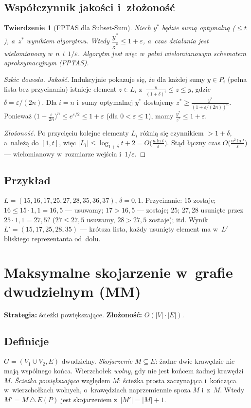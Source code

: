 \documentclass[11pt,a4paper]{article}
\theoremstyle{plain}
\newtheorem{twierdzenie}{Twierdzenie}[section]
\theoremstyle{definition}
\newcommand{\eps}{\varepsilon}
\begin{document}
\subsection*{Współczynnik jakości i~złożoność}
\begin{twierdzenie}[FPTAS dla Subset-Sum]\label{tw:approxss}
Niech $y^\ast$ będzie sumą optymalną ($\le t$), a~$z^\ast$ wynikiem algorytmu. Wtedy
$\dfrac{y^\ast}{z^\ast}\le 1+\eps$, a~czas działania jest wielomianowy w~$n$ i~$1/\eps$. Algorytm jest więc
w~pełni wielomianowym schematem aproksymacyjnym (FPTAS).
\end{twierdzenie}
\begin{proof}[Szkic dowodu]
\emph{Jakość.} Indukcyjnie pokazuje się, że dla każdej sumy $y\in P_i$ (pełna lista bez przycinania)
istnieje element $z\in L_i$ z~$\frac{y}{(1+\delta)^i}\le z\le y$, gdzie $\delta=\eps/(2n)$. Dla $i=n$ i~sumy
optymalnej $y^\ast$ dostajemy $z^\ast\ge\frac{y^\ast}{(1+\eps/(2n))^n}$. Ponieważ
$\big(1+\tfrac{\eps}{2n}\big)^n\le e^{\eps/2}\le 1+\eps$ (dla $0<\eps\le1$), mamy
$\frac{y^\ast}{z^\ast}\le 1+\eps$.

\emph{Złożoność.} Po przycięciu kolejne elementy $L_i$ różnią się czynnikiem $>1+\delta$, a~należą do
$[1,t]$, więc $|L_i|\le \log_{1+\delta}t+2=O\!\big(\tfrac{n\ln t}{\eps}\big)$. Stąd łączny czas
$O\!\big(\tfrac{n^2\ln t}{\eps}\big)$ --- wielomianowy w~rozmiarze wejścia i~$1/\eps$.
\end{proof}

\subsection*{Przykład}
$L=(15,16,17,25,27,28,35,36,37)$, $\delta=0{,}1$. Przycinanie: $15$ zostaje; $16\le15\cdot1{,}1=16{,}5$ ---
usuwamy; $17>16{,}5$ --- zostaje; $25$; $27,28$ usunięte przez $25\cdot1{,}1=27{,}5$? ($27\le27{,}5$ usuwamy,
$28>27{,}5$ zostaje); itd. Wynik $L'=(15,17,25,28,35)$ --- krótsza lista, każdy usunięty element ma w~$L'$
bliskiego reprezentanta od~dołu.

\section{Maksymalne skojarzenie w~grafie dwudzielnym (MM)}\label{sec:matching}
\textbf{Strategia:} ścieżki powiększające. \quad\textbf{Złożoność:} $O(|V|\cdot|E|)$.

\subsection*{Definicje}
$G=(V_1\cup V_2,E)$ dwudzielny. \emph{Skojarzenie} $M\subseteq E$: żadne dwie krawędzie nie mają wspólnego
końca. Wierzchołek \emph{wolny}, gdy nie jest końcem żadnej krawędzi $M$. \emph{Ścieżka powiększająca}
względem $M$: ścieżka prosta zaczynająca i~kończąca w~wierzchołkach wolnych, o~krawędziach
naprzemiennie spoza $M$ i~z~$M$. Wtedy $M'=M\,\triangle\,E(P)$ jest skojarzeniem z~$|M'|=|M|+1$.
\end{document}
